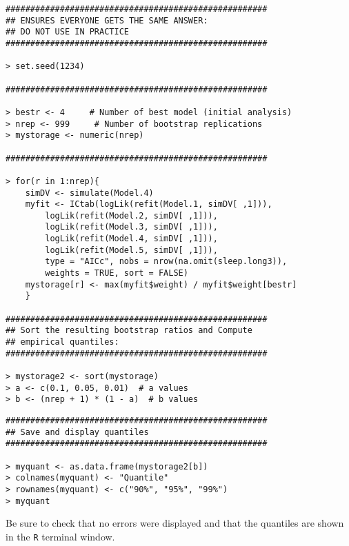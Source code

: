\documentclass[]{article}
\begin{document}
\begin{shaded}
\begin{lstlisting}
#####################################################
## ENSURES EVERYONE GETS THE SAME ANSWER:
## DO NOT USE IN PRACTICE
#####################################################

> set.seed(1234)  

#####################################################

> bestr <- 4     # Number of best model (initial analysis)
> nrep <- 999     # Number of bootstrap replications
> mystorage <- numeric(nrep)   

##################################################### 
  
> for(r in 1:nrep){ 
    simDV <- simulate(Model.4)   
    myfit <- ICtab(logLik(refit(Model.1, simDV[ ,1])), 
        logLik(refit(Model.2, simDV[ ,1])),
        logLik(refit(Model.3, simDV[ ,1])), 
        logLik(refit(Model.4, simDV[ ,1])),
        logLik(refit(Model.5, simDV[ ,1])),
        type = "AICc", nobs = nrow(na.omit(sleep.long3)), 
        weights = TRUE, sort = FALSE)
    mystorage[r] <- max(myfit$weight) / myfit$weight[bestr]
    }

#####################################################
## Sort the resulting bootstrap ratios and Compute 
## empirical quantiles:
#####################################################
 
> mystorage2 <- sort(mystorage)
> a <- c(0.1, 0.05, 0.01)  # a values
> b <- (nrep + 1) * (1 - a)  # b values
\end{lstlisting}
\end{shaded}

\newpage

\begin{shaded}
\begin{lstlisting}
#####################################################
## Save and display quantiles
#####################################################

> myquant <- as.data.frame(mystorage2[b])
> colnames(myquant) <- "Quantile"
> rownames(myquant) <- c("90%", "95%", "99%")
> myquant
\end{lstlisting}
\end{shaded}

\noindent Be sure to check that no errors were displayed and that the quantiles are shown in the \texttt{R} terminal window.


%
%
\end{document}
